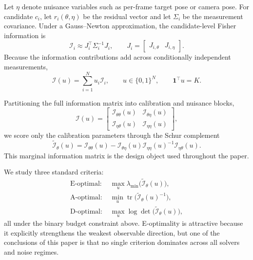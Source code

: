 \documentclass[11pt]{article}
\begin{document}
Let $\eta$ denote nuisance variables such as per-frame target pose or camera
pose. For candidate $c_i$, let $r_i(\theta,\eta)$ be the residual vector and
let $\Sigma_i$ be the measurement covariance. Under a Gauss--Newton
approximation, the candidate-level Fisher information is
\begin{equation}
\mathcal{I}_i
\approx
J_i^\top \Sigma_i^{-1} J_i,
\qquad
J_i = \begin{bmatrix} J_{i,\theta} & J_{i,\eta} \end{bmatrix}.
\end{equation}
Because the information contributions add across conditionally independent
measurements,
\begin{equation}
\mathcal{I}(u) = \sum_{i=1}^{N} u_i \mathcal{I}_i,
\qquad
u \in \{0,1\}^N,
\qquad
\mathbf{1}^\top u = K.
\end{equation}

Partitioning the full information matrix into calibration and nuisance blocks,
\begin{equation}
\mathcal{I}(u) =
\begin{bmatrix}
\mathcal{I}_{\theta\theta}(u) & \mathcal{I}_{\theta\eta}(u) \\
\mathcal{I}_{\eta\theta}(u) & \mathcal{I}_{\eta\eta}(u)
\end{bmatrix},
\end{equation}
we score only the calibration parameters through the Schur complement
\begin{equation}
\widetilde{\mathcal{I}}_\theta(u)
=
\mathcal{I}_{\theta\theta}(u)
- \mathcal{I}_{\theta\eta}(u)\mathcal{I}_{\eta\eta}(u)^{-1}\mathcal{I}_{\eta\theta}(u).
\label{eq:schur}
\end{equation}
This marginal information matrix is the design object used throughout the paper.

We study three standard criteria:
\begin{align}
\text{E-optimal: } &
\max_{u}
\lambda_{\min}\!\bigl(\widetilde{\mathcal{I}}_\theta(u)\bigr),
\\
\text{A-optimal: } &
\min_{u}
\operatorname{tr}\!\bigl(\widetilde{\mathcal{I}}_\theta(u)^{-1}\bigr),
\\
\text{D-optimal: } &
\max_{u}
\log\det\!\bigl(\widetilde{\mathcal{I}}_\theta(u)\bigr),
\end{align}
all under the binary budget constraint above. E-optimality is attractive
because it explicitly strengthens the weakest observable direction, but one of
the conclusions of this paper is that no single criterion dominates across all
solvers and noise regimes.
\end{document}
